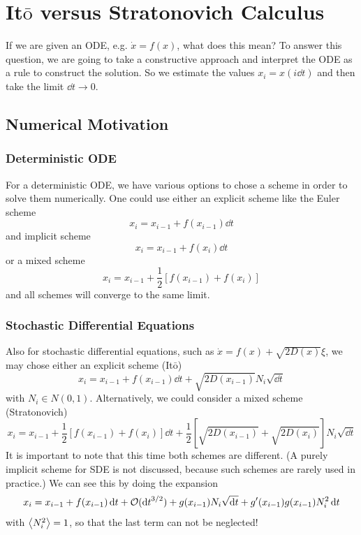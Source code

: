 \documentclass{notebook}
\begin{document}
\chapter{It$\bar{\mathrm{o}}$ versus Stratonovich Calculus}

If we are given an ODE, e.g. $\dot{x} = f(x)$, what does this mean? To answer this question, we are going to take a constructive approach and interpret the ODE as a rule to construct the solution. So we estimate the values $x_i = x(i \dd{t})$ and then take the limit $\dd{t} \to 0$.

\section{Numerical Motivation}

\subsection*{Deterministic ODE} 

For a deterministic ODE, we have various options to chose a scheme in order to solve them numerically. One could use either an explicit scheme like the Euler scheme 
%
\begin{equation}
	x_i = x_{i-1} + f(x_{i-1}) \dd{t}
\end{equation}
%
and implicit scheme 
%
\begin{equation}
	x_i = x_{i-1} + f(x_i) \dd{t}
\end{equation}
%
or a mixed scheme
%
\begin{equation}
	x_i = x_{i-1} + \frac{1}{2} [f(x_{i-1}) + f(x_i)]
\end{equation}
%
and all schemes will converge to the same limit.

\subsection*{Stochastic Differential Equations} 

Also for stochastic differential equations, such as $\dot{x} = f(x) + \sqrt{2 D(x)} \xi$, we may chose either an explicit scheme (It$\bar{\mathrm{o}}$) 
%
\begin{equation}
x_i = x_{i-1} + f(x_{i-1}) \dd{t} + \sqrt{2 D(x_{i-1})} N_i \sqrt{\dd{t}}
\end{equation}
%
with $N_i \in N(0,1)$. Alternatively, we could consider a mixed scheme (Stratonovich)
%
\begin{equation}
x_i = x_{i-1} + \frac{1}{2} [f(x_{i-1}) + f(x_i)] \dd{t} + \frac{1}{2} [\sqrt{2 D(x_{i-1})} + \sqrt{2 D(x_i)}] N_i \sqrt{\dd{t}}
\end{equation}
%
It is important to note that this time both schemes are different. (A purely implicit scheme for SDE is not discussed, because such schemes are rarely used in practice.) We can see this by doing the expansion
%
\begin{equation}
x_i = x_{i-1} + f(x_{i-1}) \dd{t} + \mathcal{O}(\dd{t}^{3/2}) + g(x_{i-1}) N_i \sqrt{\dd{t}} + g'(x_{i-1}) g(x_{i-1}) N_i^2 \dd{t}
\end{equation}
%
with $\expval{N_i^2} = 1$, so that the last term can not be neglected!
\end{document}
